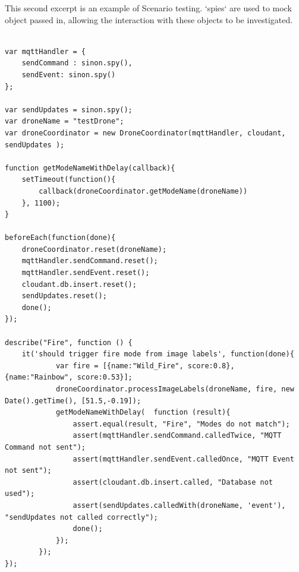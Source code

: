 \documentclass{article}
\begin{document}
This second excerpt is an example of Scenario testing. `spies` are used to mock object passed in, allowing the interaction with these objects to be investigated. 
\begin{lstlisting}[label=mocha2]

var mqttHandler = {
	sendCommand : sinon.spy(),
	sendEvent: sinon.spy()
};

var sendUpdates = sinon.spy();
var droneName = "testDrone";
var droneCoordinator = new DroneCoordinator(mqttHandler, cloudant, sendUpdates );

function getModeNameWithDelay(callback){
	setTimeout(function(){
		callback(droneCoordinator.getModeName(droneName))
	}, 1100);
}

beforeEach(function(done){
	droneCoordinator.reset(droneName);
	mqttHandler.sendCommand.reset();
	mqttHandler.sendEvent.reset();
	cloudant.db.insert.reset();
	sendUpdates.reset();
	done();
});

describe("Fire", function () {
	it('should trigger fire mode from image labels', function(done){
            var fire = [{name:"Wild_Fire", score:0.8}, {name:"Rainbow", score:0.53}];
            droneCoordinator.processImageLabels(droneName, fire, new Date().getTime(), [51.5,-0.19]);
            getModeNameWithDelay(  function (result){
                assert.equal(result, "Fire", "Modes do not match");
                assert(mqttHandler.sendCommand.calledTwice, "MQTT Command not sent");
                assert(mqttHandler.sendEvent.calledOnce, "MQTT Event not sent");
                assert(cloudant.db.insert.called, "Database not used");
                assert(sendUpdates.calledWith(droneName, 'event'), "sendUpdates not called correctly");
                done();
            });
        });
});
\end{lstlisting} 
\end{document}
